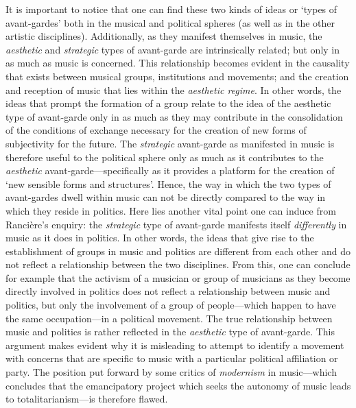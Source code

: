 It is important to notice that one can find these two kinds of ideas or `types of avant-gardes' both in the musical and political spheres (as well as in the other artistic disciplines). Additionally, as they manifest themselves in music, the \emph{aesthetic} and \emph{strategic} types of avant-garde are intrinsically related; but only in as much as music is concerned.  This relationship becomes evident in the causality that exists between musical groups, institutions and movements; and the creation and reception of music that lies within the \emph{aesthetic regime}. In other words, the ideas that prompt the formation of a group relate to the idea of the aesthetic type of avant-garde only in as much as they may contribute in the consolidation of the conditions of exchange necessary for the creation of new forms of subjectivity for the future. The \emph{strategic} avant-garde as manifested in music is therefore useful to the political sphere only as much as it contributes to the \emph{aesthetic} avant-garde---specifically as it provides a platform for the creation of `new sensible forms and structures'. Hence, the way in which the two types of avant-gardes dwell within music can not be directly compared to the way in which they reside in politics. Here lies another vital point one can induce from Ranci\`{e}re's enquiry: the \emph{strategic} type of avant-garde manifests itself \emph{differently} in music as it does in politics. In other words, the ideas that give rise to the establishment of groups in music and politics are different from each other and do not reflect a relationship between the two disciplines. From this, one can conclude for example that the activism of a musician or group of musicians as they become directly involved in politics does not reflect a relationship between music and politics, but only the involvement of a group of people---which happen to have the same occupation---in a political movement. The true relationship between music and politics is rather reflected in the \emph{aesthetic} type of avant-garde. This argument makes evident why it is misleading to attempt to identify a movement with concerns that are specific to music with a particular political affiliation or party. The position put forward by some critics of \emph{modernism} in music---which concludes that the emancipatory project which seeks the autonomy of music leads to totalitarianism---is therefore flawed.  

